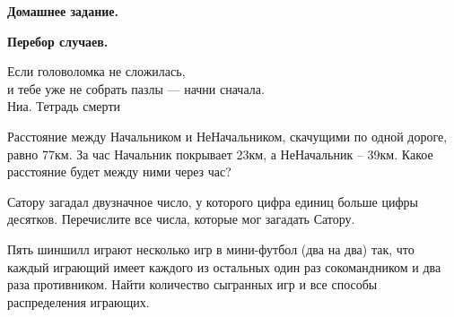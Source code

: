 \centerline{\bf \Huge Домашнее задание.}
\centerline{\bf \Huge Перебор случаев.}

\begin{flushright}
        \scriptsize{Если головоломка не сложилась,\\ и тебе уже не собрать пазлы — начни сначала. \\Ниа. Тетрадь смерти}
\end{flushright}

 Расстояние между Начальником и НеНачальником, скачущими по одной дороге, равно 77км. За час Начальник покрывает 23км, а НеНачальник – 39км. Какое расстояние будет между ними через час?

 Сатору загадал двузначное число, у которого цифра единиц больше цифры десятков. Перечислите все числа, которые мог загадать Сатору.

 Пять шиншилл играют несколько игр в мини-футбол (два на два) так, что каждый играющий имеет каждого из остальных один раз сокомандником и два раза противником. Найти количество сыгранных игр и все способы распределения играющих.